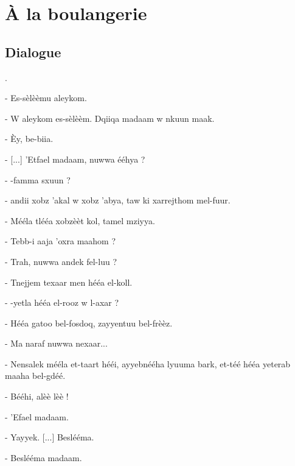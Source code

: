 \chapter{À la boulangerie}

\section{Dialogue}
.\newline

- Es-sèlèèmu \ca aleykom. 

- W \ca aleykom es-sèlèèm. Dqiiqa madaam w nkuun m\ca aak.

- Èy, be\ct-\ct bii\ca a.

- [...] 'Etfa\cdh\cdh el madaam, \vs nuwwa \vs ééhya ? 

- \VS-famma sxuun ? 

- \CA andii xobz 'ak\hb al w xobz 'abya\cdh, taw ki xarrejthom mel-fuur.

- Mééla tléé\th a xobzèèt k\hb ol, ta\ca mel mziyya.

- T\hb ebb-\vs i \hb aaja 'oxra m\ca aahom ? 

- Trah, \vs nuwwa \ca andek fel-\hb luu ? 

- Tnejjem tex\ct aar men héé\dh a el-koll.

- \VS-yetla\ca{} héé\dh a el-rooz w l-ax\cdh ar ? 

- Héé\dh a gatoo bel-fosdoq, zayyentuu bel-frèèz.

- Ma na\ca raf\vs{} \vs nuwwa nex\ct aar...

- Nensa\hb lek mééla et-taart héé\dh i, \ct ayyebnééha lyuuma bark, et-téé héé\dh a yete\vs rab m\ca aaha bel-gdéé.

- Bééhi, a\ca lèè\vs{} lèè !

- 'E\ct fa\cdh\cdh el madaam.

- Y\ca ayy\vs ek. [...] Beslééma.

- Beslééma madaam.